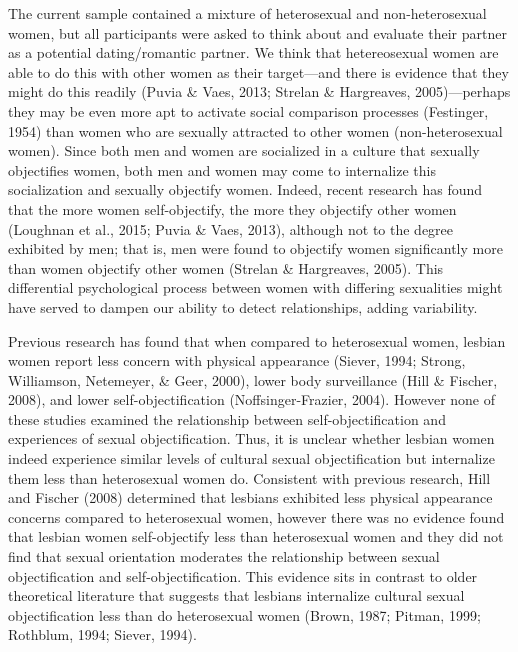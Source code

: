 \documentclass[man]{apa6}
\begin{document}
The current sample contained a mixture of heterosexual and
non-heterosexual women, but all participants were asked to think about
and evaluate their partner as a potential dating/romantic partner. We
think that hetereosexual women are able to do this with other women as
their target---and there is evidence that they might do this readily
(Puvia \& Vaes, 2013; Strelan \& Hargreaves, 2005)---perhaps they may be
even more apt to activate social comparison processes (Festinger, 1954)
than women who are sexually attracted to other women (non-heterosexual
women). Since both men and women are socialized in a culture that
sexually objectifies women, both men and women may come to internalize
this socialization and sexually objectify women. Indeed, recent research
has found that the more women self-objectify, the more they objectify
other women (Loughnan et al., 2015; Puvia \& Vaes, 2013), although not
to the degree exhibited by men; that is, men were found to objectify
women significantly more than women objectify other women (Strelan \&
Hargreaves, 2005). This differential psychological process between women
with differing sexualities might have served to dampen our ability to
detect relationships, adding variability.

Previous research has found that when compared to heterosexual women,
lesbian women report less concern with physical appearance (Siever,
1994; Strong, Williamson, Netemeyer, \& Geer, 2000), lower body
surveillance (Hill \& Fischer, 2008), and lower self-objectification
(Noffsinger-Frazier, 2004). However none of these studies examined the
relationship between self-objectification and experiences of sexual
objectification. Thus, it is unclear whether lesbian women indeed
experience similar levels of cultural sexual objectification but
internalize them less than heterosexual women do. Consistent with
previous research, Hill and Fischer (2008) determined that lesbians
exhibited less physical appearance concerns compared to heterosexual
women, however there was no evidence found that lesbian women
self-objectify less than heterosexual women and they did not find that
sexual orientation moderates the relationship between sexual
objectification and self-objectification. This evidence sits in contrast
to older theoretical literature that suggests that lesbians internalize
cultural sexual objectification less than do heterosexual women (Brown,
1987; Pitman, 1999; Rothblum, 1994; Siever, 1994).
\end{document}
